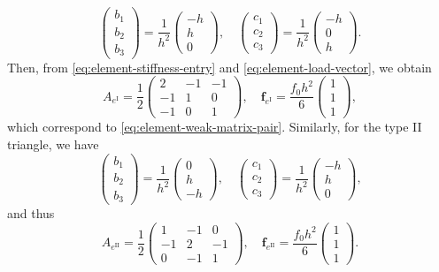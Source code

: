 \[\begin{pmatrix}b_1\\b_2\\b_3\end{pmatrix}=\frac1{h^2}\begin{pmatrix}-h\\h\\0\end{pmatrix},\quad
\begin{pmatrix}c_1\\c_2\\c_3\end{pmatrix}=\frac1{h^2}\begin{pmatrix}-h\\0\\h\end{pmatrix}.\]
{Then, from \eqref{eq:element-stiffness-entry} and \eqref{eq:element-load-vector}, we obtain}
\begin{equation}\label{eq:type-one-element-matrix}
A_{e^{\mathrm I}}=\frac12\begin{pmatrix}2&-1&-1\\-1&1&0\\-1&0&1\end{pmatrix},\quad
\boldsymbol{f}_{e^{\mathrm I}}=\frac{f_0h^2}{6}\begin{pmatrix}1\\1\\1\end{pmatrix},
\end{equation}
{which correspond to \eqref{eq:element-weak-matrix-pair}. Similarly, for the type II triangle, we have}
\[\begin{pmatrix}b_1\\b_2\\b_3\end{pmatrix}=\frac1{h^2}\begin{pmatrix}0\\h\\-h\end{pmatrix},\quad
\begin{pmatrix}c_1\\c_2\\c_3\end{pmatrix}=\frac1{h^2}\begin{pmatrix}-h\\h\\0\end{pmatrix},\]
{and thus}
\begin{equation}\label{eq:type-two-element-matrix}
A_{e^{\mathrm {II}}}=\frac12\begin{pmatrix}1&-1&0\\-1&2&-1\\0&-1&1\end{pmatrix},\quad
\boldsymbol{f}_{e^{\mathrm {II}}}=\frac{f_0h^2}{6}\begin{pmatrix}1\\1\\1\end{pmatrix}.
\end{equation}
